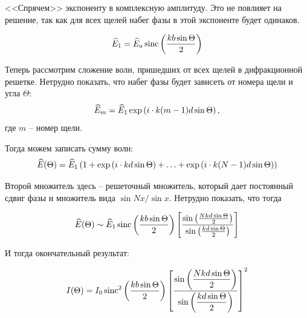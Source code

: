 <<Спрячем>> экспоненту в комплексную амплитуду. Это не повлияет на решение, так как для всех щелей набег фазы в этой экспоненте будет одинаков.

\begin{equation}
	\widehat{E}_{1}=\widehat{E}_{a}\operatorname{sinc}\left(\frac{k b \sin\Theta}{2}\right)
\end{equation}

Теперь рассмотрим сложение волн, пришедших от всех щелей в дифракционной решетке. Нетрудно показать, что набег фазы будет зависеть от номера щели и угла $\Theta$:
\begin{equation}
	\widehat{E}_m=\widehat{E}_{1}\exp\left(i\cdot k (m-1)d\sin\Theta\right),
\end{equation}
где $m$ -- номер щели.

Тогда можем записать сумму волн:
\begin{equation}
	\widehat{E}(\Theta)=\widehat{E}_1 \left(
		1+\exp\left(i\cdot kd\sin\Theta\right)+\ldots+\exp\left(i\cdot k (N-1)d\sin\Theta\right)
	\right)
\end{equation}

Второй множитель здесь -- решеточный множитель, который дает постоянный сдвиг фазы и множитель вида $\sin  Nx / \sin x$. Нетрудно показать, что тогда

\begin{equation}
	\widehat{E}(\Theta) \sim \widehat{E}_1 \operatorname{sinc}\left(\frac{k b \sin\Theta}{2}\right)
	\left[
		\frac{\sin\left(\frac{Nk d \sin\Theta}{2}\right)}{\sin\left(\frac{k d \sin\Theta}{2}\right)}
	\right]
\end{equation}

И тогда окончательный результат:

\begin{equation}
	I(\Theta) = I_0 \operatorname{sinc}^2\left(\frac{k b \sin\Theta}{2}\right)
	\left[
		\frac{\displaystyle\sin\left(\frac{Nk d \sin\Theta}{2}\right)}{\displaystyle\sin\left(\frac{k d \sin\Theta}{2}\right)}
	\right]^2
\end{equation}

\newpage
